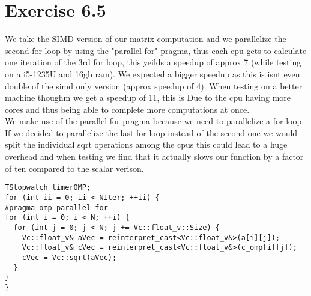 \documentclass[a4paper]{article}
\begin{document}
\section*{Exercise 6.5}
We take the SIMD version of our matrix computation and we parallelize the second for loop by using the "parallel for" pragma, thus each cpu gets to calculate one iteration of the 3rd for loop, this yeilds a speedup of approx 7 (while testing on a i5-1235U and 16gb ram). We expected a bigger speedup as this is isnt even double of the simd only version (approx speedup of 4). When testing on a better machine thoughm we get a speedup of 11, this is  Due to the cpu having more cores and thus being able to complete more computations at once.
\\
We make use of the parallel for pragma because we need to parallelize a for loop. If we decided to parallelize the last for loop instead of the second one we would split the individual sqrt operations among the cpus this could lead to a huge overhead and when testing we find that it actually slows our function by a factor of ten compared to the scalar verison.
\begin{lstlisting}
TStopwatch timerOMP;
for (int ii = 0; ii < NIter; ++ii) {
#pragma omp parallel for 
for (int i = 0; i < N; ++i) {
  for (int j = 0; j < N; j += Vc::float_v::Size) {
    Vc::float_v& aVec = reinterpret_cast<Vc::float_v&>(a[i][j]);
    Vc::float_v& cVec = reinterpret_cast<Vc::float_v&>(c_omp[i][j]);
    cVec = Vc::sqrt(aVec);
  }
}
}
\end{lstlisting}
\clearpage
\end{document}
